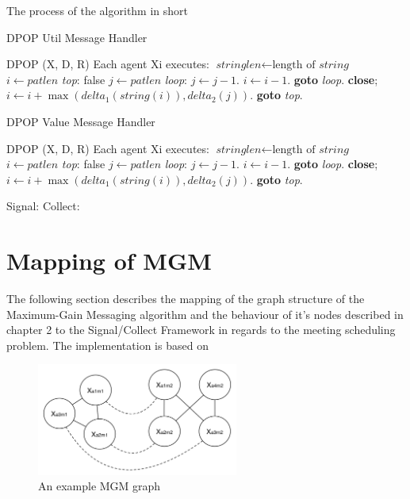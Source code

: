 The process of the algorithm in short

\begin{algorithm}[H]
\caption{DPOP Util Message Handler}\label{euclid}
\begin{algorithmic}[1]
\State DPOP (X, D, R) \newline Each agent Xi executes:
\State $\textit{stringlen} \gets \text{length of }\textit{string}$
\State $i \gets \textit{patlen}$
\BState \emph{top}:
 \Return false
\EndIf
\State $j \gets \textit{patlen}$
\BState \emph{loop}:
\State $j \gets j-1$.
\State $i \gets i-1$.
\State \textbf{goto} \emph{loop}.
\State \textbf{close};
\EndIf
\State $i \gets i+\max(\textit{delta}_1(\textit{string}(i)),\textit{delta}_2(j))$.
\State \textbf{goto} \emph{top}.
\end{algorithmic}
\end{algorithm}

\begin{algorithm}[H]
\caption{DPOP Value Message Handler}\label{euclid}
\begin{algorithmic}[1]
\State DPOP (X, D, R) \newline Each agent Xi executes:
\State $\textit{stringlen} \gets \text{length of }\textit{string}$
\State $i \gets \textit{patlen}$
\BState \emph{top}:
 \Return false
\EndIf
\State $j \gets \textit{patlen}$
\BState \emph{loop}:
\State $j \gets j-1$.
\State $i \gets i-1$.
\State \textbf{goto} \emph{loop}.
\State \textbf{close};
\EndIf
\State $i \gets i+\max(\textit{delta}_1(\textit{string}(i)),\textit{delta}_2(j))$.
\State \textbf{goto} \emph{top}.
\end{algorithmic}
\end{algorithm}

Signal:
Collect:


\section{Mapping of MGM}

The following section describes the mapping of the graph structure of the Maximum-Gain Messaging algorithm and the behaviour of it's nodes described in chapter 2 to the Signal/Collect Framework in regards to the meeting scheduling problem. The implementation is based on \cite{Chapman2010}

\begin{figure}[h]
\includegraphics[width=250px]{graphics/mgm_graph}
\centering
\caption{An example MGM graph}
\label{fig:mgm_graph}
\end{figure}

